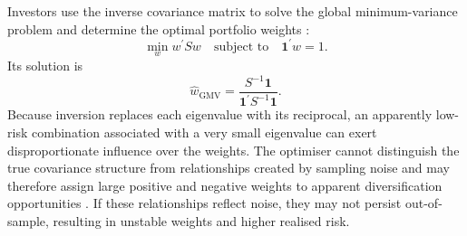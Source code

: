 Investors use the inverse covariance matrix to solve the global minimum-variance problem and determine the optimal portfolio weights \parencite[614]{LEDOIT2003603}:
\[
\min_w w^{\prime}S w
\quad\text{subject to}\quad
\mathbf{1}^{\prime}w=1.
\]
Its solution is
\[
\widehat{w}_{\mathrm{GMV}}
=
\frac{S^{-1}\mathbf{1}}
{\mathbf{1}^{\prime}S^{-1}\mathbf{1}}.
\]
Because inversion replaces each eigenvalue with its reciprocal, an apparently low-risk combination associated with a very small eigenvalue can exert disproportionate influence over the weights. The optimiser cannot distinguish the true covariance structure from relationships created by sampling noise and may therefore assign large positive and negative weights to apparent diversification opportunities \parencite[111]{ledoit2004honey}. If these relationships reflect noise, they may not persist out-of-sample, resulting in unstable weights and higher realised risk.
